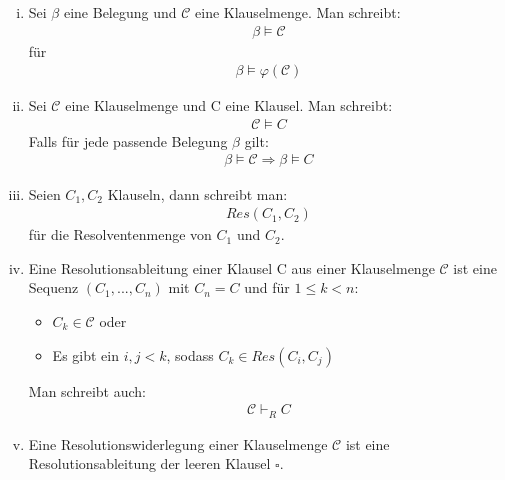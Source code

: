 \documentclass[a4paper,10pt]{article}
\begin{document}
\begin{enumerate}[(i)]
		\item
			Sei $\beta$ eine Belegung und $\mathcal{C}$ eine Klauselmenge. Man schreibt:
			\begin{align*}
				\beta \vDash \mathcal{C}
			\end{align*}
			für
			\begin{align*}
				\beta \vDash \varphi(\mathcal{C})
			\end{align*}
			
		\item
			Sei $\mathcal{C}$ eine Klauselmenge und C eine Klausel. Man schreibt:
			\begin{align*}
				\mathcal{C} \vDash C
			\end{align*}
			Falls für jede passende Belegung $\beta$ gilt:
			\begin{align*}
				\beta \vDash \mathcal{C} \Rightarrow \beta \vDash C
			\end{align*}
		
		\item
			Seien $C_1, C_2$ Klauseln, dann schreibt man:
			\begin{align*}
				Res(C_1,C_2)
			\end{align*}
			für die Resolventenmenge von $C_1$ und $C_2$.
		
		\item
			Eine Resolutionsableitung einer Klausel C aus einer Klauselmenge $\mathcal{C}$ ist eine Sequenz $(C_1,...,C_n)$ mit $C_n = C$ und 					für
			$1 \leq k < n$:
			\begin{itemize}
				\item
					$C_k \in \mathcal{C}$ oder
				\item
					Es gibt ein $i,j < k$, sodass $C_k \in Res(C_i,C_j)$
			\end{itemize}
			
			Man schreibt auch:
			\begin{align*}
				\mathcal{C} \vdash_R C
			\end{align*}
		\item
			Eine Resolutionswiderlegung einer Klauselmenge $\mathcal{C}$ ist eine Resolutionsableitung der leeren Klausel $\square$.	
	\end{enumerate}	 
	
\end{document}
